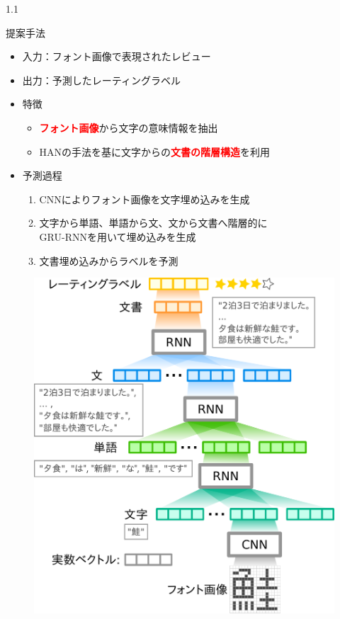\documentclass[unicode,10pt]{beamer}
\newlength{\mycolumnwidth}
\newcommand{\fire}[1]{\textcolor{red}{\textbf{#1}}}
\begin{document}
\begin{frame}[t]
\begin{columns}[onlytextwidth,t]
  \begin{column}{1.1\mycolumnwidth}
    \begin{block}{提案手法}
      \begin{itemize}
        \item 入力：フォント画像で表現されたレビュー
        \item 出力：予測したレーティングラベル
        \item 特徴
          \begin{itemize}
            \item \fire{フォント画像}から文字の意味情報を抽出
            \item HAN\cite{yang16}の手法を基に文字からの\fire{文書の階層構造}を利用
          \end{itemize}
        \item 予測過程
          \begin{enumerate}
            \item CNNによりフォント画像を文字埋め込みを生成
            \item 文字から単語、単語から文、文から文書へ階層的に \\
                  GRU-RNNを用いて埋め込みを生成
            \item 文書埋め込みからラベルを予測
          \end{enumerate}
      \end{itemize}
      \begin{figure}
        \includegraphics[width=0.8\linewidth]{fig/fcwsd.pdf}

\end{figure}
\end{block}
\end{column}
\end{columns}
\end{frame}
\end{document}

